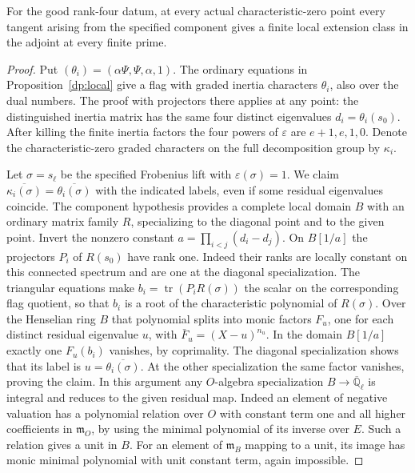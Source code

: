 \begin{proposition}\label{spreal:four}
For the good rank-four datum, at every actual characteristic-zero
point every tangent arising from the specified component gives a
finite local extension class in the adjoint at every finite prime.
\end{proposition}
\begin{proof}
Put \((\theta_i)=(\alpha\Psi,\Psi,\alpha,1)\). The ordinary
equations in Proposition~\ref{dp:local} give a flag with graded inertia
characters \(\theta_i\), also over the dual numbers. The proof with
projectors there applies at any point: the distinguished inertia
matrix has the same four distinct eigenvalues \(d_i=\theta_i(s_0)\).
After killing the finite inertia factors the four powers of
\(\varepsilon\) are \(e+1,e,1,0\). Denote the characteristic-zero
graded characters on the full decomposition group by \(\kappa_i\).

Let \(\sigma=s_\ell\) be the specified Frobenius lift with
\(\varepsilon(\sigma)=1\). We claim
\(\overline{\kappa_i(\sigma)}=\overline{\theta_i(\sigma)}\)
with the indicated labels, even if some residual eigenvalues coincide.
The component hypothesis provides a complete local domain \(B\)
with an ordinary matrix family \(R\), specializing to the diagonal
point and to the given point. Invert the nonzero constant
\(a=\prod_{i<j}(d_i-d_j)\). On \(B[1/a]\) the projectors
\(P_i\) of \(R(s_0)\) have rank one. Indeed their ranks are locally
constant on this connected spectrum and are one at the diagonal
specialization. The triangular equations make
\(b_i=\operatorname{tr}(P_iR(\sigma))\) the scalar on the
corresponding flag quotient, so that \(b_i\) is a root of the
characteristic polynomial of \(R(\sigma)\).
Over the Henselian ring \(B\) that polynomial splits into monic
factors \(F_u\), one for each distinct residual eigenvalue \(u\),
with \(\bar F_u=(X-u)^{n_u}\). In the domain \(B[1/a]\)
exactly one \(F_u(b_i)\) vanishes, by coprimality. The diagonal
specialization shows that its label is
\(u=\overline{\theta_i(\sigma)}\). At the other specialization
the same factor vanishes, proving the claim. In this argument any
\(O\)-algebra specialization \(B\to\overline{\mathbb Q}_\ell\)
is integral and reduces to the given residual map. Indeed an
element of negative valuation has a polynomial relation over
\(O\) with constant term one and all higher coefficients in
\(\mathfrak m_O\), by using the minimal polynomial of its inverse
over \(E\). Such a relation gives a unit in \(B\). For an element
of \(\mathfrak m_B\) mapping to a unit, its image has monic
minimal polynomial with unit constant term, again impossible.


\end{proof}

